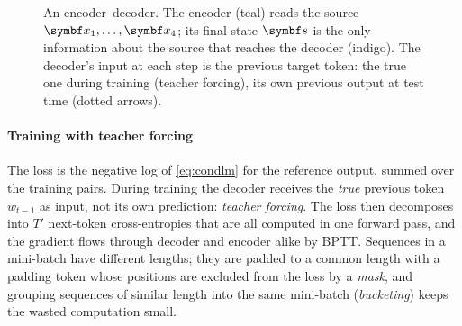 \documentclass[11pt]{article}
\newcommand{\hv}{\vect{h}}
\newcommand{\bos}{\texttt{<bos>}}
\newcommand{\eos}{\texttt{<eos>}}
\begin{document}
\begin{figure}[htbp]
\centering
{}
\caption{An encoder--decoder. The encoder (teal) reads the source $\x_1, \dots, \x_4$; its final state $\vect{s}$ is the only
information about the source that reaches the decoder (indigo). The decoder's input at each step is the previous target
token: the true one during training (teacher forcing), its own previous output at test time (dotted arrows).}
\label{fig:seq2seq}
\end{figure}

\paragraph{Training with teacher forcing} The loss is the negative log of \eqref{eq:condlm} for the reference output,
summed over the training pairs. During training the decoder receives the \emph{true} previous token $w_{t-1}$ as input,
not its own prediction: \emph{teacher forcing}. The loss then decomposes into $T'$ next-token cross-entropies that are all
computed in one forward pass, and the gradient flows through decoder and encoder alike by BPTT. Sequences in a mini-batch
have different lengths; they are padded to a common length with a padding token whose positions are excluded from the
loss by a \emph{mask}, and grouping sequences of similar length into the same mini-batch (\emph{bucketing}) keeps the
wasted computation small.
\end{document}
